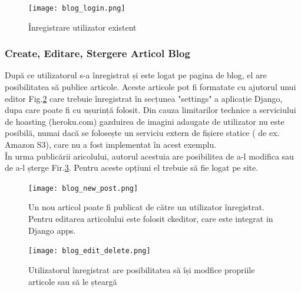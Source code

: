 \documentclass[11pt]{scrartcl} %
\begin{document}
\begin{figure}[h] %
	\centering
	\texttt{[image: blog\_login.png]} %
	\caption{Înregistrare utilizator existent}
	\label{fig:blog_login}
\end{figure}



\subsubsection{Create, Editare, Stergere Articol Blog}

După ce utilizatorul s-a înregistrat și este logat pe pagina de blog, el are posibilitatea să publice articole. Aceste articole pot fi formatate cu ajutorul unui editor Fig.\ref{fig:blog_new_post} care trebuie înregistrat în secțunea "settings" a aplicație Django, dupa care poate fi cu ușurință folosit. Din cauza limitarilor technice a serviciului de hoasting (heroku.com) gazduirea de imagini adaugate de utilizator nu este posibilă, numai dacă se folosește un serviciu extern de fișiere statice ( de ex. Amazon S3), care nu a fost implementat în acest exemplu.\\
În urma publicării aricolului, autorul acestuia are posibilitea de a-l modifica sau de a-l șterge Fir.\ref{fig:blog_edit}. Pentru aceste opțiuni el trebuie să fie logat pe site.

\begin{figure}[h] %
	\centering
	\texttt{[image: blog\_new\_post.png]} %
	\caption{Un nou articol poate fi publicat de către un utilizator înregistrat. Pentru editarea articolului este folosit ckeditor, care este integrat in Django apps.}
	\label{fig:blog_new_post}
\end{figure}

\begin{figure}[h] %
	\centering
	\texttt{[image: blog\_edit\_delete.png]} %
	\caption{Utilizatorul înregistrat are posibilitatea să își modfice propriile articole sau să le șteargă}
	\label{fig:blog_edit}
\end{figure}



\end{document}
